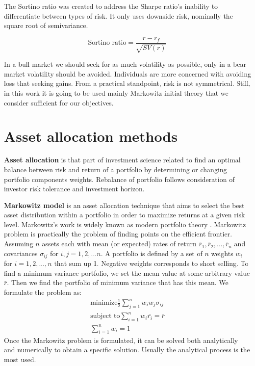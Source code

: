 The Sortino ratio was created to address the Sharpe ratio's inability to differentiate between types of risk.
It only uses downside risk, nominally the square root of semivariance.

$$ \text{Sortino ratio} = \frac{r - r_f}{\sqrt{SV(r)}} $$

In a bull market we should seek for as much volatility as possible, only in a bear market volatility should be avoided. Individuals are more concerned with avoiding loss that seeking gains. From a practical standpoint, risk is not symmetrical. Still, in this work it is going to be used mainly Markowitz initial theory that we consider sufficient for our objectives. 



\section{Asset allocation methods}
\label{s:asset_allocation_methods}

\textbf{Asset allocation} is that part of investment science related to find an optimal balance between risk and return of a portfolio by determining or changing portfolio components weights. Rebalance of portfolio follows consideration of investor risk tolerance and investment horizon.  


\textbf{Markowitz model} is an asset allocation technique that aims to select the best asset distribution within a portfolio in order to maximize returns at a given risk level. Markowitz's work is widely known as modern portfolio theory \cite{investmentscience}. 
Markowitz problem is practically the problem of finding points on the efficient frontier.
Assuming $n$ assets each with mean (or expected) rates of return $\bar{r}_1,\bar{r}_2,...,\bar{r}_n$ and covariances $\sigma_{ij}$ for $i,j=1,2,...n$. A portfolio is defined by a set of $n$ weights $w_i$ for $i=1,2,...,n$ that sum up 1. Negative weights corresponds to short selling. To find a minimum variance portfolio, we set the mean value at some arbitrary value $\bar{r}$. Then we find the portfolio of minimum variance that has this mean. We formulate the problem as: 
\begin{align*}
    \text{minimize} \frac{1}{2} \sum_{j=1}^{n} w_i w_j \sigma_{ij}\\
    \text{subject to} \sum_{i=1}^{n} w_i \bar{r_i} = \bar{r}\\
    \sum_{i=1}^{n} w_i = 1    
\end{align*}
Once the Markowitz problem is formulated, it can be solved both analytically and numerically  to obtain a specific solution. Usually the analytical process is the most used.

